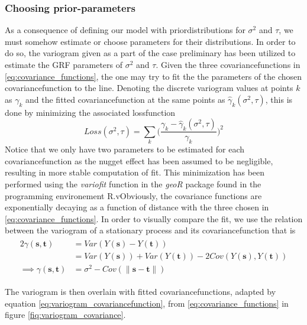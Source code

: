 \subsubsection{Choosing prior-parameters}
As a consequence of defining our model with priordistributions for $\sigma^2$ and $\tau$, we must somehow estimate or choose parameters for their distributions. In order to do so, the variogram given as a part of the case preliminary has been utilized to estimate the GRF parameters of $\sigma^2$ and $\tau$. Given the three covariancefunctions in \ref{eq:covariance_functions}, the one may try to fit the the parameters of the chosen covariancefunction to the line. Denoting the discrete variogram values at points $k$ as $\gamma_k$ and the fitted covariancefunction at the same points as $\hat{\gamma}_k(\sigma^2, \tau)$, this is done by minimizing the associated lossfunction
\begin{equation}
Loss(\sigma^2, \tau) = \sum_k \bigg( \frac{\gamma_k - \hat{\gamma}_k(\sigma^2, \tau)}{\gamma_k} \bigg)^2
\end{equation}
Notice that we only have two parameters to be estimated for each covariancefunction as the nugget effect has been assumed to be negligible, resulting in more stable computation of fit. This minimization has been performed using the \textit{variofit} function in the \textit{geoR} package found in the programming environement R.vObviously, the covariance functions are exponentially decaying as a function of distance with the three chosen in \ref{eq:covariance_functions}. In order to visually compare the fit, we use the relation between the variogram of a stationary process and its covariancefunction that is
\begin{align} \label{eq:variogram_covariancefunction}
\begin{split}
    2\gamma(\textbf{s},\textbf{t}) &= Var(Y(\textbf{s}) - Y(\textbf{t})) \\
    &= Var(Y(\textbf{s})) + Var(Y(\textbf{t})) - 2Cov(Y(\textbf{s}),Y(\textbf{t})) \\
    \implies \gamma(\textbf{s},\textbf{t}) &= \sigma^2 - Cov(\|\textbf{s}-\textbf{t}\|) 
\end{split}
\end{align}

The variogram is then overlain with fitted covariancefunctions, adapted by equation \ref{eq:variogram_covariancefunction}, from \ref{eq:covariance_functions} in figure \ref{fiq:variogram_covariance}.  \\

